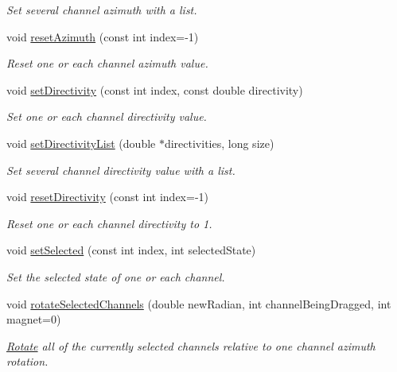 \begin{DoxyCompactItemize}
\begin{DoxyCompactList}\small\item\em Set several channel azimuth with a list. \end{DoxyCompactList}\item 
void \hyperlink{class_hoa2_d_1_1_channel_manager_ad1c309e1aa908bb9e74ff585baede311}{reset\-Azimuth} (const int index=-\/1)
\begin{DoxyCompactList}\small\item\em Reset one or each channel azimuth value. \end{DoxyCompactList}\item 
void \hyperlink{class_hoa2_d_1_1_channel_manager_a8b3ee410134a6968da701333c5706ae2}{set\-Directivity} (const int index, const double directivity)
\begin{DoxyCompactList}\small\item\em Set one or each channel directivity value. \end{DoxyCompactList}\item 
void \hyperlink{class_hoa2_d_1_1_channel_manager_a7056e91301e2ff1134aeaaabd49c1175}{set\-Directivity\-List} (double $\ast$directivities, long size)
\begin{DoxyCompactList}\small\item\em Set several channel directivity value with a list. \end{DoxyCompactList}\item 
void \hyperlink{class_hoa2_d_1_1_channel_manager_aaaaf03b0a4ea963f307f4a2db6e6ea9b}{reset\-Directivity} (const int index=-\/1)
\begin{DoxyCompactList}\small\item\em Reset one or each channel directivity to 1. \end{DoxyCompactList}\item 
void \hyperlink{class_hoa2_d_1_1_channel_manager_a98cb3ded60590e0bee7e348b569fa951}{set\-Selected} (const int index, int selected\-State)
\begin{DoxyCompactList}\small\item\em Set the selected state of one or each channel. \end{DoxyCompactList}\item 
void \hyperlink{class_hoa2_d_1_1_channel_manager_a5fd94710fde98d24c1476979bfb394c0}{rotate\-Selected\-Channels} (double new\-Radian, int channel\-Being\-Dragged, int magnet=0)
\begin{DoxyCompactList}\small\item\em \hyperlink{class_hoa2_d_1_1_rotate}{Rotate} all of the currently selected channels relative to one channel azimuth rotation. \end{DoxyCompactList}\item 

\end{DoxyCompactItemize}
